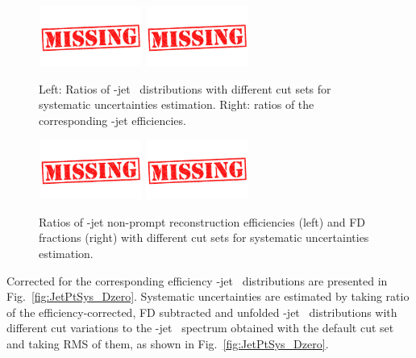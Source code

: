 \begin{figure}[bth]
\begin{center}
\includegraphics[width=0.3\textwidth]{missing}
\includegraphics[width=0.3\textwidth]{missing}
\caption{Left: Ratios of \Dzero-jet \pt\ distributions with different cut sets for systematic uncertainties estimation. Right: ratios of the corresponding \Dzero-jet efficiencies.} 
\label{fig:JetPtRawSysRatio_Dzero}
\end{center}
\end{figure}

\begin{figure}[bth]
\begin{center}
\includegraphics[width=0.3\textwidth]{missing}
\includegraphics[width=0.3\textwidth]{missing}
\caption{Ratios of \Dzero-jet non-prompt reconstruction efficiencies (left) and FD fractions (right) with different cut sets for systematic uncertainties estimation.} 
\label{fig:JetcutVarFD_Dzero}
\end{center}
\end{figure} 

Corrected for the corresponding efficiency \Dzero-jet \ptchjet\ distributions are presented in Fig.~\ref{fig:JetPtSys_Dzero}. Systematic uncertainties are estimated by taking ratio of the efficiency-corrected, FD subtracted and unfolded \Dzero-jet \ptchjet\ distributions with different cut variations to the \Dzero-jet \pt\ spectrum obtained with the default cut set and taking RMS of them, as shown in Fig.~\ref{fig:JetPtSys_Dzero}.

